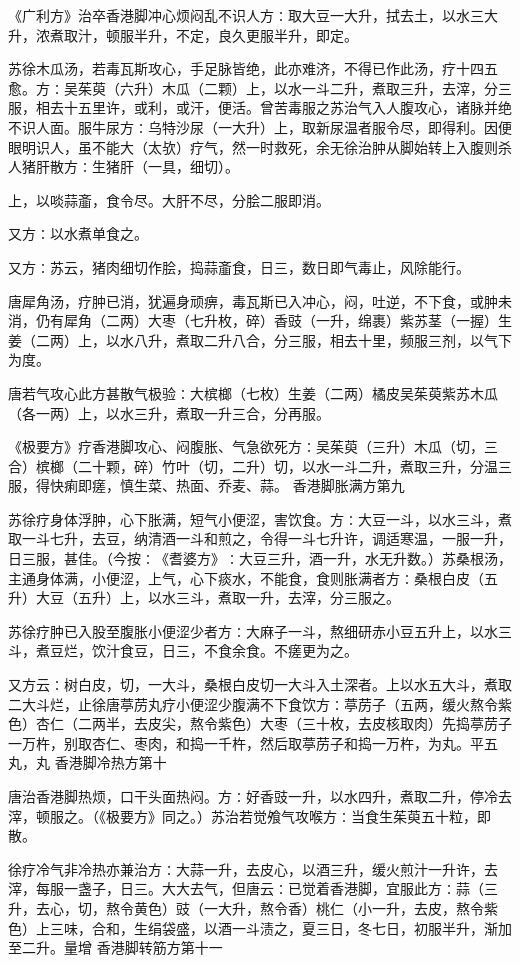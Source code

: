 \documentclass[a4paper,12pt,UTF8,twoside]{ctexbook}
\begin{document}
《广利方》治卒香港脚冲心烦闷乱不识人方∶取大豆一大升，拭去土，以水三大升，浓煮取汁，顿服半升，不定，良久更服半升，即定。

苏徐木瓜汤，若毒瓦斯攻心，手足脉皆绝，此亦难济，不得已作此汤，疗十四五愈。方∶吴茱萸（六升）木瓜（二颗）上，以水一斗二升，煮取三升，去滓，分三服，相去十五里许，或利，或汗，便活。曾苦毒服之苏治气入人腹攻心，诸脉并绝不识人面。服牛尿方∶乌特沙尿（一大升）上，取新尿温者服令尽，即得利。因便眼明识人，虽不能大（太欤）疗气，然一时救死，余无徐治肿从脚始转上入腹则杀人猪肝散方∶生猪肝（一具，细切）。

上，以啖蒜齑，食令尽。大肝不尽，分脍二服即消。

又方∶以水煮单食之。

又方∶苏云，猪肉细切作脍，捣蒜齑食，日三，数日即气毒止，风除能行。

唐犀角汤，疗肿已消，犹遍身顽痹，毒瓦斯已入冲心，闷，吐逆，不下食，或肿未消，仍有犀角（二两）大枣（七升枚，碎）香豉（一升，绵裹）紫苏茎（一握）生姜（二两）上，以水八升，煮取二升八合，分三服，相去十里，频服三剂，以气下为度。

唐若气攻心此方甚散气极验∶大槟榔（七枚）生姜（二两）橘皮吴茱萸紫苏木瓜（各一两）上，以水三升，煮取一升三合，分再服。

《极要方》疗香港脚攻心、闷腹胀、气急欲死方∶吴茱萸（三升）木瓜（切，三合）槟榔（二十颗，碎）竹叶（切，二升）切，以水一斗二升，煮取三升，分温三服，得快痢即瘥，慎生菜、热面、乔麦、蒜。
香港脚胀满方第九

苏徐疗身体浮肿，心下胀满，短气小便涩，害饮食。方∶大豆一斗，以水三斗，煮取一斗七升，去豆，纳清酒一斗和煎之，令得一斗七升许，调适寒温，一服一升，日三服，甚佳。（今按∶《耆婆方》∶大豆三升，酒一升，水无升数。）苏桑根汤，主通身体满，小便涩，上气，心下痰水，不能食，食则胀满者方∶桑根白皮（五升）大豆（五升）上，以水三斗，煮取一升，去滓，分三服之。

苏徐疗肿已入股至腹胀小便涩少者方∶大麻子一斗，熬细研赤小豆五升上，以水三斗，煮豆烂，饮汁食豆，日三，不食余食。不瘥更为之。

又方云∶树白皮，切，一大斗，桑根白皮切一大斗入土深者。上以水五大斗，煮取二大斗烂，止徐唐葶苈丸疗小便涩少腹满不下食饮方∶葶苈子（五两，缓火熬令紫色）杏仁（二两半，去皮尖，熬令紫色）大枣（三十枚，去皮核取肉）先捣葶苈子一万杵，别取杏仁、枣肉，和捣一千杵，然后取葶苈子和捣一万杵，为丸。平五丸，丸
香港脚冷热方第十

唐治香港脚热烦，口干头面热闷。方∶好香豉一升，以水四升，煮取二升，停冷去滓，顿服之。（《极要方》同之。）苏治若觉飧气攻喉方∶当食生茱萸五十粒，即散。

徐疗冷气非冷热亦兼治方∶大蒜一升，去皮心，以酒三升，缓火煎汁一升许，去滓，每服一盏子，日三。大大去气，但唐云∶已觉着香港脚，宜服此方∶蒜（三升，去心，切，熬令黄色）豉（一大升，熬令香）桃仁（小一升，去皮，熬令紫色）上三味，合和，生绢袋盛，以酒一斗渍之，夏三日，冬七日，初服半升，渐加至二升。量增
香港脚转筋方第十一
\end{document}
